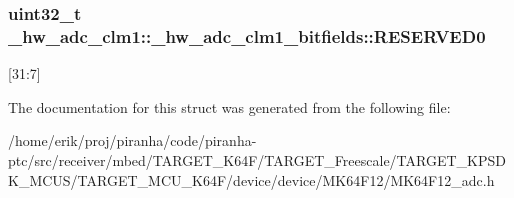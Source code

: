 \subsubsection[{\texorpdfstring{R\+E\+S\+E\+R\+V\+E\+D0}{RESERVED0}}]{\setlength{\rightskip}{0pt plus 5cm}uint32\+\_\+t \+\_\+hw\+\_\+adc\+\_\+clm1\+::\+\_\+hw\+\_\+adc\+\_\+clm1\+\_\+bitfields\+::\+R\+E\+S\+E\+R\+V\+E\+D0}\hypertarget{struct__hw__adc__clm1_1_1__hw__adc__clm1__bitfields_aad5731b46b332ccbbaeff16ddaa68582}{}\label{struct__hw__adc__clm1_1_1__hw__adc__clm1__bitfields_aad5731b46b332ccbbaeff16ddaa68582}
\mbox{[}31\+:7\mbox{]} 

The documentation for this struct was generated from the following file\+:\begin{DoxyCompactItemize}
\item 
/home/erik/proj/piranha/code/piranha-\/ptc/src/receiver/mbed/\+T\+A\+R\+G\+E\+T\+\_\+\+K64\+F/\+T\+A\+R\+G\+E\+T\+\_\+\+Freescale/\+T\+A\+R\+G\+E\+T\+\_\+\+K\+P\+S\+D\+K\+\_\+\+M\+C\+U\+S/\+T\+A\+R\+G\+E\+T\+\_\+\+M\+C\+U\+\_\+\+K64\+F/device/device/\+M\+K64\+F12/M\+K64\+F12\+\_\+adc.\+h\end{DoxyCompactItemize}

